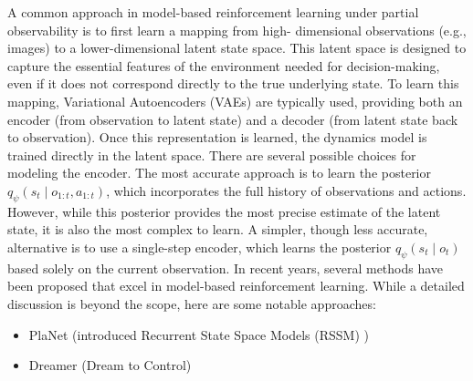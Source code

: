 A common approach in model-based reinforcement learning under partial observability is to first learn a mapping from high-
dimensional observations (e.g., images) to a lower-dimensional latent state space. This latent space is designed to capture the 
essential features of the environment needed for decision-making, even if it does not correspond directly to the true underlying 
state. To learn this mapping, Variational Autoencoders (VAEs) are typically used, providing both an encoder (from observation to 
latent state) and a decoder (from latent state back to observation). Once this representation is learned, the dynamics model is 
trained directly in the latent space.\newline 
There are several possible choices for modeling the encoder. The most accurate approach is to learn the posterior $q_\psi(s_t 
\mid o_{1:t}, a_{1:t})$, which incorporates the full history of observations and actions. However, while this posterior provides 
the most precise estimate of the latent state, it is also the most complex to learn. A simpler, though less accurate, alternative 
is to use a single-step encoder, which learns the posterior $q_\psi(s_t \mid o_t)$ based solely on the current observation. \newline
In recent years, several methods have been proposed that excel in model-based reinforcement learning. While a detailed discussion
is beyond the scope, here are some notable approaches:
\begin{itemize} 
\item PlaNet (introduced Recurrent State Space Models (RSSM) ) \cite{hafner2019learninglatentdynamicsplanning}
\item Dreamer (Dream to Control) \cite{hafner2020dreamcontrollearningbehaviors}
\end{itemize}

